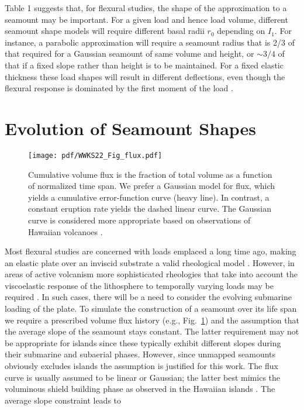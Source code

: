 Table 1 suggests that, for flexural studies, the shape of the approximation to a seamount may be important.
For a given load and hence load volume, different seamount shape models will require different basal radii
$r_0$ depending on $I_1$.  For instance, a parabolic approximation will require a seamount radius that is 2/3
of that required for a Gaussian seamount of same volume and height, or $\sim 3/4$ of that if a fixed slope rather
than height is to be maintained. For a fixed elastic thickness these load shapes will result in different deflections,
even though the flexural response is dominated by the first moment of the load \citep{M1981}.

\section{Evolution of Seamount Shapes}
\label{sec:evol}
\begin{figure}[h]
\centering
\texttt{[image: pdf/WWKS22\_Fig\_flux.pdf]}
\caption{Cumulative volume flux is the fraction of total volume as a function of normalized time span.
We prefer a Gaussian model for flux, which yields a cumulative error-function curve (heavy line). In contrast,
a constant eruption rate yields the dashed linear curve.
The Gaussian curve is considered more appropriate based on observations of Hawaiian volcanoes \citep{DS1996}.}
\label{WWKS22_Fig_flux}
\end{figure}
Most flexural studies are concerned with loads emplaced a long time ago, making an elastic plate over an inviscid substrate
a valid rheological model \citep[e.g.,~][]{WC74}.  However, in areas of active volcanism more sophisticated rheologies that take into
account the viscoelastic response of the lithosphere to temporally varying loads may be required \citep[e.g.,~][]{ZW2013}.
In such cases, there will be a need to consider the evolving submarine loading of the plate. To simulate the construction
of a seamount over its life span we require a prescribed volume flux history (e.g., Fig.~\ref{WWKS22_Fig_flux})
and the assumption that the average slope of the seamount stays constant.  The latter requirement may not be
appropriate for islands since these typically exhibit different slopes during their submarine and subaerial
phases.  However, since unmapped seamounts obviously excludes islands the assumption is justified for this
work. The flux curve is usually assumed to be linear or Gaussian; the latter best mimics the voluminous shield
building phase as observed in the Hawaiian islands \citep{DS1996}.  The average slope constraint leads to
